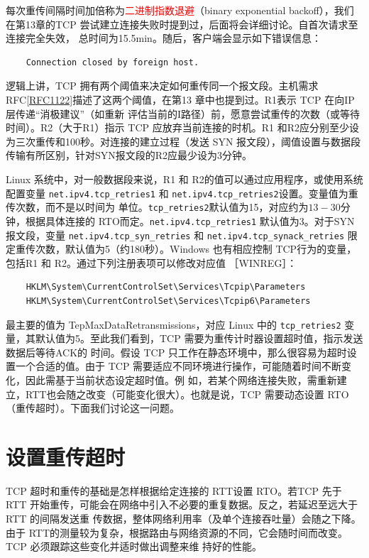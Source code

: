 每次重传间隔时间加倍称为\textcolor{red}{二进制指数退避}（binary exponential
backoff），我们在第13章的TCP 尝试建立连接失败时提到过，后面将会详细讨论。自首次请求至连接完全失效，
总时间为15.5min。随后，客户端会显示如下错误信息：
\begin{verbatim}
    Connection closed by foreign host.
\end{verbatim}

逻辑上讲，TCP 拥有两个阈值来决定如何重传同一个报文段。主机需求
RFC\href{https://www.rfc-editor.org/rfc/rfc1122}{[RFC1122]}描述了这两个阈值，在第13
章中也提到过。R1表示 TCP 在向IP 层传递“消极建议”（如重新
评估当前的I路径）前，愿意尝试重传的次数（或等待时间）。R2（大于R1）指示 TCP 应放弃当前连接的时机。R1
和R2应分别至少设为三次重传和100秒。对连接的建立过程（发送
SYN 报文段），阈值设置与数据段传输有所区别，针对SYN报文段的R2应最少设为3分钟。

Linux 系统中，对一般数据段来说，R1 和 R2的值可以通过应用程序，或使用系统配置变量
\verb|net.ipv4.tcp_retries1| 和 \verb|net.ipv4.tcp_retries2|设置。变量值为重传次数，而不是以时间为
单位。\verb|tcp_retries2|默认值为15，对应约为\(13-30\)分钟，根据具体连接的
RTO而定。\verb|net.ipv4.tcp_retries1| 默认值为3。对于SYN报文段，变量
\verb|net.ipv4.tcp_syn_retries|
和 \verb|net.ipv4.tcp_synack_retries| 限定重传次数，默认值为5（约180秒）。Windows
也有相应控制 TCP行为的变量，包括R1 和 R2。通过下列注册表项可以修改对应值 ［WINREG］：

\begin{verbatim}
    HKLM\System\CurrentControlSet\Services\Tcpip\Parameters
    HKLM\System\CurrentControlSet\Services\Tcpip6\Parameters
\end{verbatim}

最主要的值为 TepMaxDataRetransmissions，对应 Linux 中的 \verb|tcp_retries2|
变量，其默认值为5。至此我们看到，TCP 需要为重传计时器设置超时值，指示发送数据后等待ACK的
时间。假设 TCP 只工作在静态环境中，那么很容易为超时设置一个合适的值。由于 TCP
需要适应不同环境进行操作，可能随着时间不断变化，因此需基于当前状态设定超时值。例
如，若某个网络连接失败，需重新建立，RTT也会随之改变（可能变化很大）。也就是说，TCP 需要动态设置 RTO（重传超时）。下面我们讨论这一问题。

\section{设置重传超时}
TCP 超时和重传的基础是怎样根据给定连接的 RTT设置 RTO。若TCP 先于 RTT
开始重传，可能会在网络中引入不必要的重复数据。反之，若延迟至远大于 RTT 的间隔发送重
传数据，整体网络利用率（及单个连接吞吐量）会随之下降。由于 RTT的测量较为复杂，根据路由与网络资源的不同，它会随时间而改变。TCP
必须跟踪这些变化并适时做出调整来维
持好的性能。

